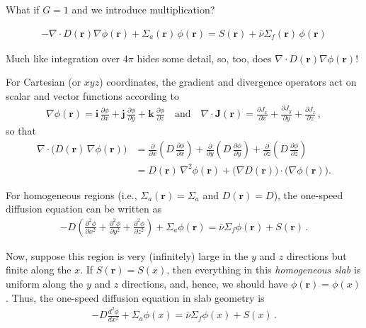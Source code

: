 \documentclass[compact]{ne630handout}
\begin{document}
\begin{handoutflow}
What if $G=1$ and we introduce multiplication?

\begin{align*}
\tag{FNRP 6.12}
\boxed{ - \nabla\!\cdot\! D(\mathbf{r}) \nabla \phi(\mathbf{r})
   + \Sigma_{a}(\mathbf{r})\, \phi(\mathbf{r})
  =  S(\mathbf{r}) + \bar{\nu}\Sigma_{f}(\mathbf{r})\, \phi(\mathbf{r})
}
\end{align*}

Much like integration over $4\pi$ hides some detail, so, too, does $\nabla\!\cdot\! D(\mathbf{r}) \nabla \phi(\mathbf{r})$!

For Cartesian (or $xyz$) coordinates, the gradient and divergence operators act on scalar and vector functions according to
\begin{align*}
\nabla \phi(\mathbf{r})
= \mathbf{i} \,\frac{\partial \phi}{\partial x}
 + \mathbf{j}  \,\frac{\partial \phi}{\partial y}
 + \mathbf{k}  \,\frac{\partial \phi}{\partial z} \quad \text{and} \quad
\nabla\!\cdot\!\mathbf{J}(\mathbf{r})
= \frac{\partial J_x}{\partial x}
 + \frac{\partial J_y}{\partial y}
 + \frac{\partial J_z}{\partial z} \, ,
\end{align*}
so that
\begin{align*}
\nabla\!\cdot\!\big(D(\mathbf{r})\,\nabla \phi(\mathbf{r})\big)
&= \frac{\partial}{\partial x}\!\left(D\,\frac{\partial \phi}{\partial x}\right)
 + \frac{\partial}{\partial y}\!\left(D\,\frac{\partial \phi}{\partial y}\right)
 + \frac{\partial}{\partial z}\!\left(D\,\frac{\partial \phi}{\partial z}\right) \\[4pt]
&= D(\mathbf{r})\,\nabla^2 \phi(\mathbf{r})
  + \big(\nabla D(\mathbf{r})\big)\!\cdot\!\big(\nabla \phi(\mathbf{r})\big).
\end{align*}

For homogeneous regions (i.e., $\Sigma_a(\mathbf{r}) = \Sigma_a$ and $D(\mathbf{r}) = D$),
the one-speed diffusion equation can be written as
\begin{align*}
  -D \left (\frac{\partial^2 \phi}{\partial x^2} +
            \frac{\partial^2 \phi}{\partial y^2} +
            \frac{\partial^2 \phi}{\partial z^2} \right )
  + \Sigma_{a}\phi(\mathbf{r})
  = \bar{\nu}\Sigma_{f} \phi(\mathbf{r})  +  S(\mathbf{r}) \, .
\end{align*}

Now, suppose this region is very (infinitely) large in the $y$ and $z$ directions but finite along the $x$.  If $S(\mathbf{r}) = S(x)$, then everything in this {\it homogeneous slab} is uniform along the $y$ and $z$ directions, and, hence, we should have $\phi(\mathbf{r}) = \phi(x)$.  Thus, the one-speed diffusion equation in slab geometry is
\begin{align*}
  -D \frac{d^2 \phi}{d x^2}
  + \Sigma_{a}\phi(x)
  = \bar{\nu}\Sigma_{f} \phi(x)  +  S(x) \, .
\end{align*}


\end{handoutflow}
\end{document}
